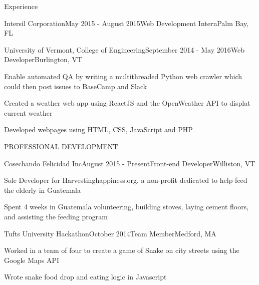 \documentclass{resume} %
\begin{document}
\begin{rSection}{Experience}
\begin{rSubsection}{Intersil Corporation}{May 2015 - August 2015}{Web Development Intern}{Palm Bay, FL}
\end{rSubsection}


\begin{rSubsection}{University of Vermont, College of Engineering}{September 2014 - May 2016}{Web Developer}{Burlington, VT}

\item Enable automated QA by writing a multithreaded Python web crawler which could then post issues to BaseCamp and Slack
\item Created a weather web app using ReactJS and the OpenWeather API to displat current weather 
\item Developed webpages using HTML, CSS, JavaScript and PHP 

\end{rSubsection}


\end{rSection}



\begin{rSection}{PROFESSIONAL DEVELOPMENT}


\begin{rSubsection}{Cosechando Felicidad Inc}{August 2015 - Present}{Front-end Developer}{Williston, VT}

\item Sole Developer for Harvestinghappiness.org, a non-profit dedicated to help feed the elderly in Guatemala
\item Spent 4 weeks in Guatemala volunteering, building stoves, laying cement floors, and assisting the feeding program

\end{rSubsection}


\begin{rSubsection}{Tufts University Hackathon}{October 2014}{Team Member}{Medford, MA}

\item Worked in a team of four to create a game of Snake on city streets using the Google Maps API
\item Wrote snake food drop and eating logic in Javascript

\end{rSubsection}

\end{rSection}
\end{document}
